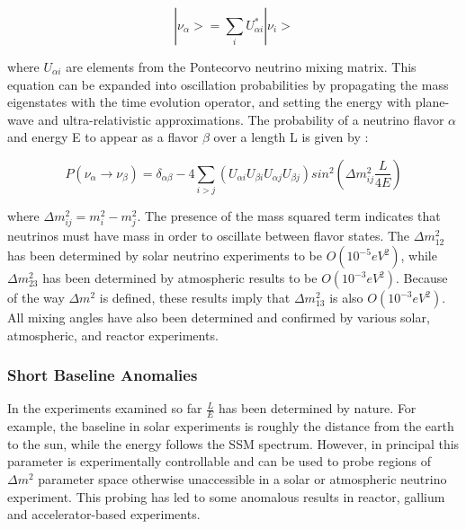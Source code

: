 \begin{equation} \label{eq:eig}
|\nu_\alpha> = \sum_{i} U_{\alpha i}^* |\nu_i>  
\end{equation}

\noindent where $U_{\alpha i}$ are elements from the Pontecorvo neutrino mixing matrix.  This equation can be expanded into oscillation probabilities by propagating the mass eigenstates with the time evolution operator, and setting the energy with plane-wave and ultra-relativistic approximations.  The probability of a neutrino flavor $\alpha$ and energy E to appear as a flavor $\beta$ over a length L is given by :


\begin{equation} \label{eq:eig}
P(\nu_\alpha\rightarrow\nu_\beta) = \delta_{\alpha\beta} - 4\sum_{i>j} (U_{\alpha i} U_{\beta i} U_{\alpha j} U_{\beta j}) sin^2(\Delta m^2_{ij} \frac{L}{4E})  
\end{equation}

\noindent where $\Delta m^2_{ij} = m^2_i - m^2_j$. The presence of the mass squared term indicates that neutrinos must have mass in order to oscillate between flavor states. The $\Delta m^2_{12}$ has been determined by solar neutrino experiments to be $O(10^{-5} eV^2)$, while $\Delta m^2_{23}$ has been determined by atmospheric results to be $O(10^{-3} eV^2)$. Because of the way $\Delta m^2$ is defined, these results imply that $\Delta m^2_{13}$ is also $O(10^{-3} eV^2)$. All mixing angles have also been determined and confirmed by various solar, atmospheric, and reactor experiments. 



\subsubsection{Short Baseline Anomalies }

\par In the experiments examined so far $\frac{L}{E}$ has been determined by nature. For example, the baseline in solar experiments is roughly the distance from the earth to the sun, while the energy follows the SSM spectrum. However, in principal this parameter is experimentally controllable and can be used to probe regions of $\Delta m^2$ parameter space otherwise unaccessible in a solar or atmospheric neutrino experiment.  This probing has led to some anomalous results in reactor, gallium and accelerator-based experiments. 
 
